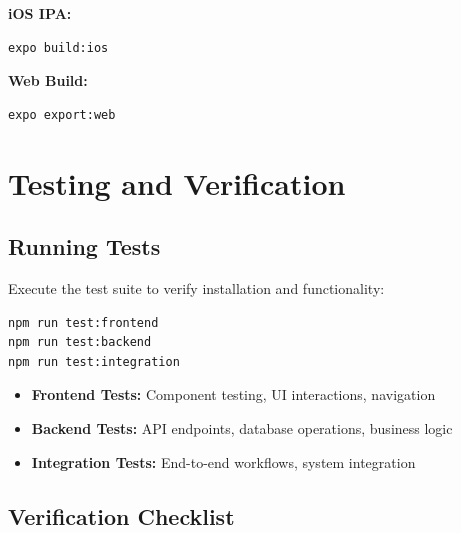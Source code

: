 \documentclass[a4paper,12pt]{article}
\begin{document}
\textbf{iOS IPA:}
\begin{lstlisting}[language=bash]
expo build:ios
\end{lstlisting}

\textbf{Web Build:}
\begin{lstlisting}[language=bash]
expo export:web
\end{lstlisting}

\section{Testing and Verification}

\subsection{Running Tests}

Execute the test suite to verify installation and functionality:

\begin{lstlisting}[language=bash]
npm run test:frontend
npm run test:backend
npm run test:integration
\end{lstlisting}

\begin{tcolorbox}[colback=lightgray,colframe=black,title=\textbf{Test Suite Overview}]
\begin{itemize}[leftmargin=*]
    \item \textbf{Frontend Tests:} Component testing, UI interactions, navigation
    \item \textbf{Backend Tests:} API endpoints, database operations, business logic
    \item \textbf{Integration Tests:} End-to-end workflows, system integration
\end{itemize}
\end{tcolorbox}

\subsection{Verification Checklist}
\end{document}
